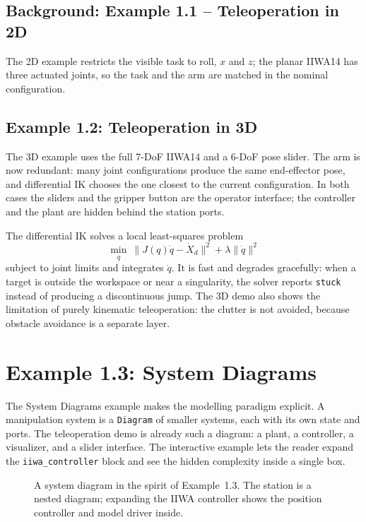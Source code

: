 \documentclass[11pt]{report}
\begin{document}
\subsection{Background: Example 1.1 -- Teleoperation in 2D}

The 2D example restricts the visible task to roll, $x$ and $z$; the planar
IIWA14 has three actuated joints, so the task and the arm are matched in the
nominal configuration.

\subsection{Example 1.2: Teleoperation in 3D}
\label{sec:ex12}

The 3D example uses the full 7-DoF IIWA14 and a 6-DoF pose slider.  The arm is now redundant: many joint configurations produce the
same end-effector pose, and differential IK chooses the one closest to the
current configuration.  In both cases the sliders and the gripper button are
the operator interface; the controller and the plant are hidden behind the
station ports.

The differential IK solves a local least-squares problem
\[
\min_{\dot q}\ \|J(q)\dot q-\dot X_d\|^2+\lambda\|\dot q\|^2
\]
subject to joint limits and integrates $\dot q$.  It is fast and degrades
gracefully: when a target is outside the workspace or near a singularity, the
solver reports \texttt{stuck} instead of producing a discontinuous jump.  The
3D demo also shows the limitation of purely kinematic teleoperation: the
clutter is not avoided, because obstacle avoidance is a separate layer.

\section{Example 1.3: System Diagrams}
\label{sec:ex13}

The System Diagrams example makes the modelling paradigm explicit.  A
manipulation system is a \texttt{Diagram} of smaller systems, each with its own
state and ports.  The teleoperation demo is already such a diagram: a plant, a
controller, a visualizer, and a slider interface.  The interactive example
lets the reader expand the \texttt{iiwa\_controller} block and see the hidden
complexity inside a single box.

\begin{figure}[htbp]
\centering
{}
\caption{A system diagram in the spirit of Example~1.3.  The station is a nested
diagram; expanding the IIWA controller shows the position controller and model
driver inside.}
\label{fig:sysdiag}
\end{figure}
\end{document}
